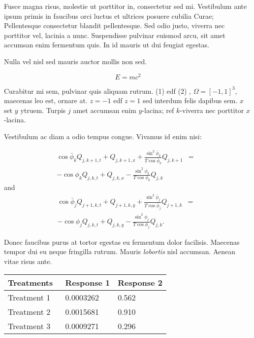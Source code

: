 \begin{multicols}{2}
Fusce magna risus, molestie ut porttitor in, consectetur sed
mi. Vestibulum ante ipsum primis in faucibus orci luctus et ultrices
posuere cubilia Curae; Pellentesque consectetur blandit
pellentesque. Sed odio justo, viverra nec porttitor vel, lacinia a
nunc. Suspendisse pulvinar euismod arcu, sit amet accumsan enim
fermentum quis. In id mauris ut dui feugiat egestas. 


Nulla vel nisl sed mauris auctor mollis non sed. 

\begin{equation}
E = mc^{2}
\label{eqn:Einstein}
\end{equation}

Curabitur mi sem, pulvinar quis aliquam rutrum. (1) edf (2) ,
$\Omega=[-1,1]^3$, maecenas leo est, ornare at. $z=-1$ edf $z=1$ sed
interdum felis dapibus sem. $x$ set $y$ ytruem.  Turpis $j$ amet
accumsan enim $y$-lacina; ref $k$-viverra nec porttitor $x$-lacina.

Vestibulum ac diam a odio tempus congue. Vivamus id enim nisi:

\begin{eqnarray}
\cos\bar{\phi}_k Q_{j,k+1,t} + Q_{j,k+1,x}+\frac{\sin^2\bar{\phi}_k}{T\cos\bar{\phi}_k} Q_{j,k+1} &=&\nonumber\\ 
-\cos\phi_k Q_{j,k,t} + Q_{j,k,x}-\frac{\sin^2\phi_k}{T\cos\phi_k} Q_{j,k}\label{edgek}
\end{eqnarray}
and
\begin{eqnarray}
\cos\bar{\phi}_j Q_{j+1,k,t} + Q_{j+1,k,y}+\frac{\sin^2\bar{\phi}_j}{T\cos\bar{\phi}_j} Q_{j+1,k}&=&\nonumber \\
-\cos\phi_j Q_{j,k,t} + Q_{j,k,y}-\frac{\sin^2\phi_j}{T\cos\phi_j} Q_{j,k}.\label{edgej}
\end{eqnarray} 

Donec faucibus purus at tortor egestas eu fermentum dolor
facilisis. Maecenas tempor dui eu neque fringilla rutrum. Mauris
\emph{lobortis} nisl accumsan. Aenean vitae risus ante.
%

\vspace{1cm}
\begin{center}
\begin{tabular}{l l l}
\toprule
\textbf{Treatments}~ & \textbf{Response 1} & \textbf{Response 2}\\
\midrule
Treatment 1 & 0.0003262 & 0.562 \\
Treatment 2 & 0.0015681 & 0.910 \\
Treatment 3 & 0.0009271 & 0.296 \\
\bottomrule
\end{tabular}
\end{center}
\vspace{1cm}


\end{multicols}
